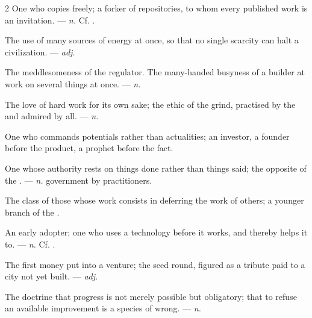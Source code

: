\begin{multicols}{2}
 One who copies freely; a forker of repositories, to whom every published work is an invitation. —  \textit{n.} Cf. .

 The use of many sources of energy at once, so that no single scarcity can halt a civilization.  —  \textit{adj.}

   The meddlesomeness of the regulator.   The many-handed busyness of a builder at work on several things at once. —  \textit{n.}

 The love of hard work for its own sake; the ethic of the grind, practised by the  and admired by all. —  \textit{n.}

 One who commands potentials rather than actualities; an investor, a founder before the product, a prophet before the fact.

 One whose authority rests on things done rather than things said; the opposite of the . —  \textit{n.} government by practitioners.

 The class of those whose work consists in deferring the work of others; a younger branch of the .

 An early adopter; one who uses a technology before it works, and thereby helps it to. —  \textit{n.} Cf. .

 The first money put into a venture; the seed round, figured as a tribute paid to a city not yet built.   —  \textit{adj.}

 The doctrine that progress is not merely possible but obligatory; that to refuse an available improvement is a species of wrong. —  \textit{n.}


\end{multicols}

